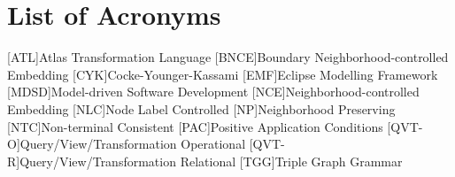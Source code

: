 \chapter*{List of Acronyms}
\begin{acronym}[MDSD]
	[ATL]{Atlas Transformation Language}
	[BNCE]{Boundary Neighborhood-controlled Embedding}
	[CYK]{Cocke-Younger-Kassami}
	[EMF]{Eclipse Modelling Framework}
	[MDSD]{Model-driven Software Development}
	[NCE]{Neighborhood-controlled Embedding}
	[NLC]{Node Label Controlled}
	[NP]{Neighborhood Preserving}
	[NTC]{Non-terminal Consistent}
	[PAC]{Positive Application Conditions}
	[QVT-O]{Query/View/Transformation Operational}
	[QVT-R]{Query/View/Transformation Relational}
	[TGG]{Triple Graph Grammar}
\end{acronym}